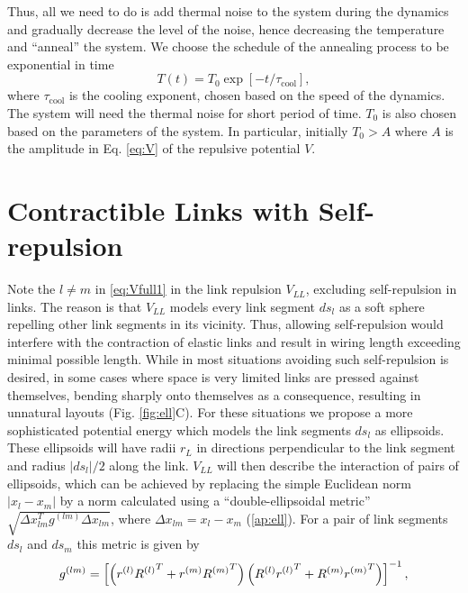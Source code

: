 \documentclass[linenumbers,endfloats,nofootinbib,preprint,floatfix,titlepage,superscriptaddress]{revtex4-1} %
\begin{document}
Thus, all we need to do is add thermal noise to the system during the dynamics and gradually decrease the level of the noise, hence decreasing the temperature and ``anneal'' the system. We choose the schedule of the annealing process to be exponential in time
\begin{equation}
T(t) = T_0 \exp[-t/\tau_{\mathrm{cool}}], \label{eq:coolexp}
\end{equation}
where $\tau_{\mathrm{cool}}$ is the cooling exponent, chosen based on the speed of the dynamics. The system will need the thermal noise for short period of time. $T_0$ is also chosen based on the parameters of the system. In particular, initially $T_0 > A$ where $A$ is the amplitude in Eq. \eqref{eq:V} of the repulsive potential $V$.   



\section{Contractible Links with Self-repulsion\label{ap:ell}}
Note the $l\ne m $ in \eqref{eq:Vfull1} in the link repulsion $V_{LL}$, excluding self-repulsion in links. 
The reason is that $V_{LL}$ models every link segment $ds_l$ as a soft sphere repelling other link segments in its vicinity.
Thus, allowing self-repulsion would interfere with the contraction of elastic links and result in wiring length exceeding minimal possible length. 
While in most situations avoiding such self-repulsion is desired, in some cases where space is very limited links are pressed against themselves, bending sharply onto themselves as a consequence, resulting in unnatural layouts (Fig. \ref{fig:ell}C).  
For these situations we propose a more sophisticated potential energy which models the link segments $ds_l$ as ellipsoids. 
These ellipsoids will have radii $r_L$ in directions perpendicular to the link segment and radius $|ds_l|/2$ along the link. 
$V_{LL}$ will then describe the interaction of pairs of ellipsoids, which can be achieved by replacing the simple Euclidean norm $|x_l-x_m|%
$ by a norm calculated using a ``double-ellipsoidal metric'' $\sqrt{\Delta x_{lm}^Tg^{(lm)}\Delta x_{lm}}$, where $\Delta x_{lm} = x_l-x_m$ (\ref{ap:ell}). 
For a pair of link segments $ds_l$ and $ds_m$ this metric is given by 
\begin{align}
    g^{(lm)} = \left[\left(r^{(l)}{R^{(l)}}^T+ r^{(m)}{R^{(m)}}^T\right) \left(R^{(l)}{r^{(l)}}^T+ R^{(m)}{r^{(m)}}^T\right) \right]^{-1},
    \label{eq:g-ell}
\end{align}
\end{document}
